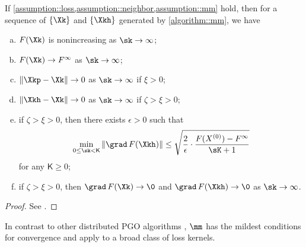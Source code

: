 \begin{prop}\label{prop::mm}
If \cref{assumption::loss,assumption::neighbor,assumption::mm} hold, then for a sequence of $\{\Xk\}$ and $\{\Xkh\}$ generated by  \cref{algorithm::mm},  we have
\begin{enumerate}[(a)]
\item\label{prop::mm1} $F(\Xk)$ is nonincreasing as $\sk\rightarrow\infty$;
\item\label{prop::mm2}  $F(\Xk)\rightarrow F^\infty$ as $\sk\rightarrow\infty$;
\item\label{prop::mm3} $\|\Xkp-\Xk\|\rightarrow 0$ as $\sk\rightarrow\infty$ if $\xi>0$;
\item\label{prop::mm4} $\|\Xkh-\Xk\|\rightarrow 0$ as $\sk\rightarrow\infty$ if $\zeta > \xi > 0$;
\item\label{prop::mm5}  if $\zeta > \xi > 0$, then there exists $\epsilon > 0$ such that 
\begin{equation}
	\nonumber
	\min\limits_{0\leq\sk< \mathsf{K}}\|\grad\, F(\Xkh)\|\leq \sqrt{\frac{2}{\epsilon}\cdot\dfrac{F(X^{(0)})-F^\infty}{{\sK+1}}}
\end{equation}
for any $\mathsf{K}\geq 0$;
\item\label{prop::mm6}  if $\zeta > \xi> 0$, then $\grad\, F(\Xk)\rightarrow \0$ and $\grad\, F(\Xkh)\rightarrow \0$ as $\sk\rightarrow \infty$.
\end{enumerate}
\end{prop}
\begin{proof}
See .
\end{proof}



\begin{remark}
In contrast to other distributed PGO algorithms \cite{tian2019distributed,tron2014distributed,choudhary2017distributed,eric2020geod},  $\mm$  has the mildest conditions for convergence and apply to a broad class of loss kernels.
\end{remark}